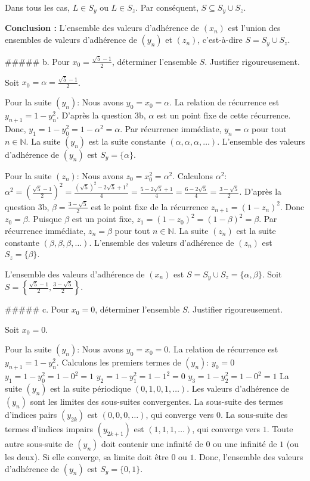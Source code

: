 \documentclass{report}
\begin{document}
    Dans tous les cas, $L \in S_y$ ou $L \in S_z$.
    Par conséquent, $S \subseteq S_y \cup S_z$.

\textbf{Conclusion :} L'ensemble des valeurs d'adhérence de $(x_n)$ est l'union des ensembles de valeurs d'adhérence de $(y_n)$ et $(z_n)$, c'est-à-dire $S = S_y \cup S_z$.

##### b. Pour $x_0 = \frac{\sqrt{5}-1}{2}$, déterminer l'ensemble $S$. Justifier rigoureusement.

Soit $x_0 = \alpha = \frac{\sqrt{5}-1}{2}$.

Pour la suite $(y_n)$:
Nous avons $y_0 = x_0 = \alpha$.
La relation de récurrence est $y_{n+1} = 1 - y_n^2$.
D'après la question 3b, $\alpha$ est un point fixe de cette récurrence.
Donc, $y_1 = 1 - y_0^2 = 1 - \alpha^2 = \alpha$.
Par récurrence immédiate, $y_n = \alpha$ pour tout $n \in \mathbb{N}$.
La suite $(y_n)$ est la suite constante $(\alpha, \alpha, \alpha, \dots)$.
L'ensemble des valeurs d'adhérence de $(y_n)$ est $S_y = \{\alpha\}$.

Pour la suite $(z_n)$:
Nous avons $z_0 = x_0^2 = \alpha^2$.
Calculons $\alpha^2$:
$\alpha^2 = \left(\frac{\sqrt{5}-1}{2}\right)^2 = \frac{(\sqrt{5})^2 - 2\sqrt{5} + 1^2}{4} = \frac{5 - 2\sqrt{5} + 1}{4} = \frac{6 - 2\sqrt{5}}{4} = \frac{3 - \sqrt{5}}{2}$.
D'après la question 3b, $\beta = \frac{3-\sqrt{5}}{2}$ est le point fixe de la récurrence $z_{n+1} = (1 - z_n)^2$.
Donc $z_0 = \beta$.
Puisque $\beta$ est un point fixe, $z_1 = (1 - z_0)^2 = (1 - \beta)^2 = \beta$.
Par récurrence immédiate, $z_n = \beta$ pour tout $n \in \mathbb{N}$.
La suite $(z_n)$ est la suite constante $(\beta, \beta, \beta, \dots)$.
L'ensemble des valeurs d'adhérence de $(z_n)$ est $S_z = \{\beta\}$.

L'ensemble des valeurs d'adhérence de $(x_n)$ est $S = S_y \cup S_z = \{\alpha, \beta\}$.
Soit $S = \left\{ \frac{\sqrt{5}-1}{2}, \frac{3-\sqrt{5}}{2} \right\}$.

##### c. Pour $x_0 = 0$, déterminer l'ensemble $S$. Justifier rigoureusement.

Soit $x_0 = 0$.

Pour la suite $(y_n)$:
Nous avons $y_0 = x_0 = 0$.
La relation de récurrence est $y_{n+1} = 1 - y_n^2$.
Calculons les premiers termes de $(y_n)$:
$y_0 = 0$
$y_1 = 1 - y_0^2 = 1 - 0^2 = 1$
$y_2 = 1 - y_1^2 = 1 - 1^2 = 0$
$y_3 = 1 - y_2^2 = 1 - 0^2 = 1$
La suite $(y_n)$ est la suite périodique $(0, 1, 0, 1, \dots)$.
Les valeurs d'adhérence de $(y_n)$ sont les limites des sous-suites convergentes.
La sous-suite des termes d'indices pairs $(y_{2k})$ est $(0, 0, 0, \dots)$, qui converge vers $0$.
La sous-suite des termes d'indices impairs $(y_{2k+1})$ est $(1, 1, 1, \dots)$, qui converge vers $1$.
Toute autre sous-suite de $(y_n)$ doit contenir une infinité de $0$ ou une infinité de $1$ (ou les deux). Si elle converge, sa limite doit être $0$ ou $1$.
Donc, l'ensemble des valeurs d'adhérence de $(y_n)$ est $S_y = \{0, 1\}$.
\end{document}
